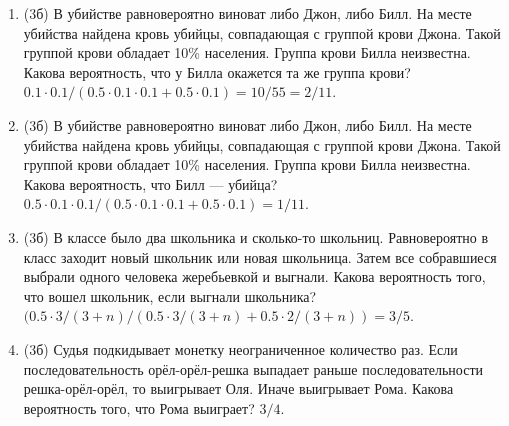 \documentclass[a4paper, 12pt]{article}
\begin{document}
\begin{enumerate}

\item (3б) В убийстве равновероятно виноват либо Джон, либо Билл. На месте убийства найдена кровь убийцы, совпадающая с группой крови Джона. 
Такой группой крови обладает 10\% населения. Группа крови Билла неизвестна. Какова вероятность, что у Билла окажется та же группа крови?
$0.1 \cdot 0.1 /(0.5 \cdot 0.1 \cdot 0.1 + 0.5 \cdot 0.1) = 10/55=2/11$.
\item (3б) В убийстве равновероятно виноват либо Джон, либо Билл. На месте убийства найдена кровь убийцы, совпадающая с группой крови Джона. 
Такой группой крови обладает 10\% населения. Группа крови Билла неизвестна. Какова вероятность, что Билл — убийца? $0.5 \cdot 0.1 \cdot 0.1 / 
(0.5 \cdot 0.1 \cdot 0.1 + 0.5 \cdot 0.1) = 1/11$.
\item (3б) В классе было два школьника и сколько-то школьниц. Равновероятно в класс заходит новый школьник или новая школьница. 
Затем все собравшиеся выбрали одного человека жеребьевкой и выгнали. Какова вероятность того, что вошел школьник, если выгнали школьника?
$(0.5 \cdot 3/(3+n) / (0.5 \cdot 3/(3+n) + 0.5 \cdot 2/(3+n)) = 3/5$.
\item (3б) Судья подкидывает монетку неограниченное количество раз. Если последовательность орёл-орёл-решка выпадает раньше
последовательности решка-орёл-орёл, то выигрывает Оля. Иначе выигрывает Рома. Какова вероятность того, что Рома выиграет?
$3/4$.
\end{enumerate}
\end{document}
